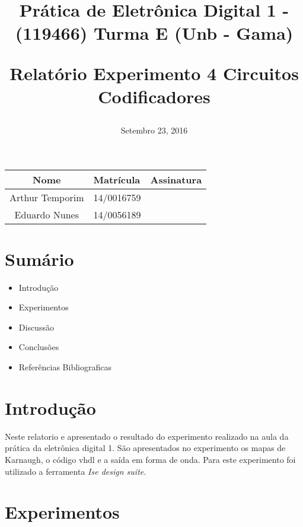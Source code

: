 \documentclass[12pts]{article}
\title{
	Prática de Eletrônica Digital 1 - (119466)
	\singlespacing
		Turma E (Unb - Gama)
	\singlespacing
	\begin{midpage}
	\begin {large}
		Relatório Experimento 4
		\singlespace
		Circuitos Codificadores
	\end {large}
	\end{midpage}
}
\date{Setembro 23, 2016}
\begin{document}
\maketitle	
\begin{center}

\begin{tabular}{|c|l|r|}
\hline
Nome & Matrícula & Assinatura\\
\hline

Arthur Temporim & 14/0016759 & \\
\hline	
Eduardo Nunes & 14/0056189 & \\

\hline	
\end{tabular}

\end{center}


\newpage

\section{Sumário}

\begin{itemize}
	\item Introdução
	\singlespacing
	\item Experimentos
	\singlespacing
	\item Discussão
	\singlespacing
	\item Conclusões 
	\singlespacing
	\item Referências Bibliograficas
	\singlespacing
\end{itemize}

\newpage


\section{Introdução}
\iffalse
Introdução, indicando a delimitação do tema, apresentando a justificativa descrevendo o propósito do relatório.
\fi

	 Neste relatorio e apresentado o resultado do experimento realizado na aula da prática da eletrônica digital 1. São apresentados no experimento os mapas de Karnaugh, o código vhdl e a saída em forma de onda. Para este experimento foi utilizado a ferramenta \textit{Ise design suite}.

\section{Experimentos}
\iffalse
Parte Experimental, descrevendo os passos realizados, dificuldades e soluções para os problemas encontrados. Aqui, deve-se apresentar uma descrição dos resultados encontrados em forma de figuras, gráficos e tabelas.
\fi
\end{document}

